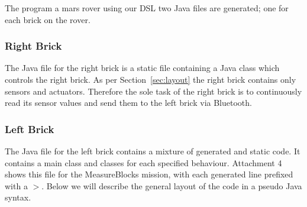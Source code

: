 The program a mars rover using our DSL two Java files are generated; one for
each brick on the rover. 

\subsubsection{Right Brick} 
The Java file for the right brick is a static file containing a Java class 
which controls the right brick. As per Section~\ref{sec:layout} the 
right brick contains only sensors and actuators. Therefore the sole
task of the right brick is to continuously read its sensor values and send them
to the left brick via Bluetooth. 

\subsubsection{Left Brick}
The Java file for the left brick contains a mixture of generated and static 
code. It contains a main class and classes for each specified behaviour. 
Attachment 4 shows this file for the MeasureBlocks mission, with each generated
line prefixed with a $>$. Below we will describe the general layout of the code
in a pseudo Java syntax.

